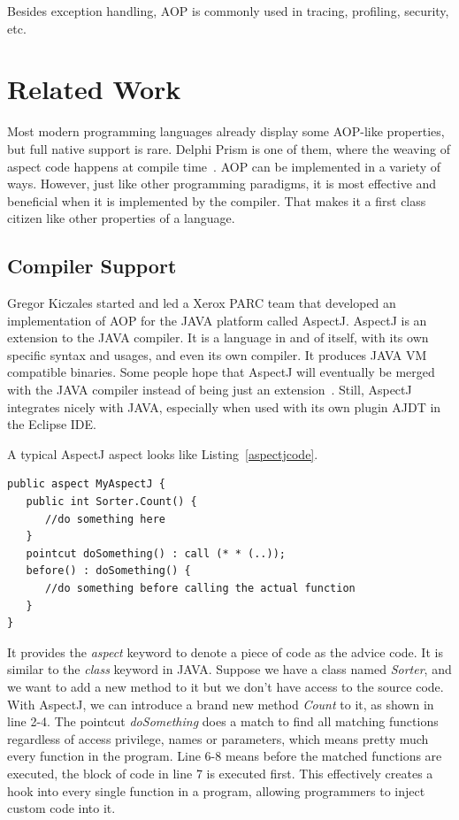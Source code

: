 Besides exception handling, AOP is commonly used in tracing, profiling, security, etc.

\section{Related Work}Most modern programming languages already display some AOP-like properties, but full native support is rare. Delphi Prism is one of them, where the weaving of aspect code happens at compile time~\cite{delphi_prism2010}. AOP can be implemented in a variety of ways. However, just like other programming paradigms, it is most effective and beneficial when it is implemented by the compiler. That makes it a first class citizen like other properties of a language.

\subsection{Compiler Support}

Gregor Kiczales started and led a Xerox PARC team that developed an implementation of AOP for the JAVA platform called AspectJ\cite{aop}. AspectJ is an extension to the JAVA compiler. It is a language in and of itself, with its own specific syntax and usages, and even its own compiler. It produces JAVA VM compatible binaries. Some people hope that AspectJ will eventually be merged with the JAVA compiler instead of being just an extension~\cite{aspectj_faq}. Still, AspectJ integrates nicely with JAVA, especially when used with its own plugin AJDT in the Eclipse IDE.

A typical AspectJ aspect looks like Listing~\ref{aspectjcode}.

\begin{lstlisting}[caption={sample AspectJ code}, label=aspecjcode]
public aspect MyAspectJ {
   public int Sorter.Count() {
      //do something here
   }
   pointcut doSomething() : call (* * (..));
   before() : doSomething() {
      //do something before calling the actual function
   }
}
\end{lstlisting}

It provides the {\em aspect} keyword to denote a piece of code as the advice code. It is similar to the {\em class} keyword in JAVA. Suppose we have a class named {\em Sorter}, and we want to add a new method to it but we don't have access to the source code. With AspectJ, we can introduce a brand new method {\em Count} to it, as shown in line 2-4. The pointcut {\em doSomething} does a match to find all matching functions regardless of access privilege, names or parameters, which means pretty much every function in the program. Line 6-8 means before the matched functions are executed, the block of code in line 7 is executed first. This effectively creates a hook into every single function in a program, allowing programmers to inject custom code into it.

